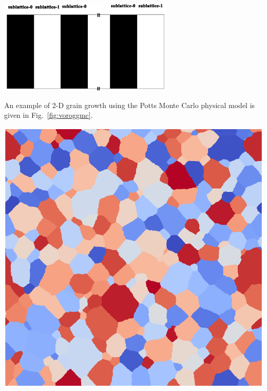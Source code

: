 \documentclass[11pt]{article}
\begin{document}
\begin{multicols*}{2}
\begin{center}
\begin{minipage}{0.475\textwidth}\centering
  \includegraphics[height=1.75in]{mc-fig-01}
\end{minipage}
\end{center}

An example of 2-D grain growth using the Potts Monte Carlo physical model is given in Fig.~\ref{fig:voroggmc}.

\begin{center}\begin{minipage}{0.45\textwidth}\centering
  \includegraphics[width=\textwidth]{graingrowth-mc}
\end{minipage}\end{center}



\end{multicols*}
\end{document}
